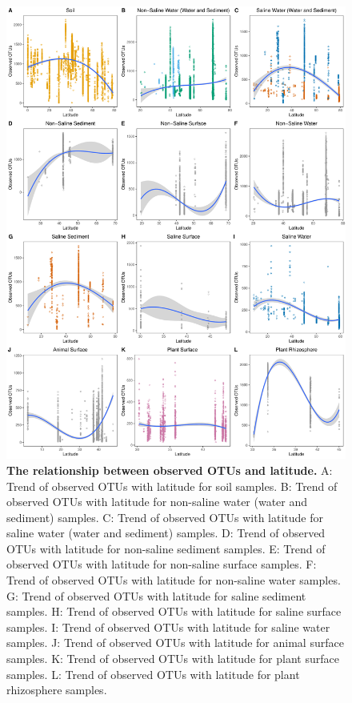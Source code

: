 \begin{figure}[H]
    \centering
    \includegraphics[scale=0.33]{./Figures/OO_lati_empo3}
    \caption{\textbf{The relationship between observed OTUs and latitude.} A: Trend of observed OTUs with latitude for soil samples. B: Trend of observed OTUs with latitude for non-saline water (water and sediment) samples. C: Trend of observed OTUs with latitude for saline water (water and sediment) samples. D: Trend of observed OTUs with latitude for non-saline sediment samples. E: Trend of observed OTUs with latitude for non-saline surface samples. F: Trend of observed OTUs with latitude for non-saline water samples. G: Trend of observed OTUs with latitude for saline sediment samples. H: Trend of observed OTUs with latitude for saline surface samples. I: Trend of observed OTUs with latitude for saline water samples. J: Trend of observed OTUs with latitude for animal surface samples. K: Trend of observed OTUs with latitude for plant surface samples. L: Trend of observed OTUs with latitude for plant rhizosphere samples.}
    \label{fig:OO_lati3}
\end{figure}


